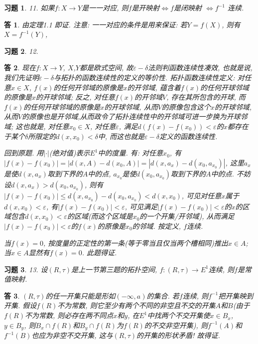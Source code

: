 \documentclass{ctexart}%
\newtheorem*{exercise}{习题}
\newtheorem*{solution}{答}
\theoremstyle{definition}
\theoremstyle{remark}
\begin{document}
\begin{exercise}11. 如果$f: X\rightarrow Y$是一一对应, 则$f$是开映射$\Longleftrightarrow f$是闭映射
$\Longleftrightarrow f^{-1}$ 连续.
\end{exercise}
\begin{solution}由定理1.1 即证. 注意: 一一对应的条件是用来保证: 若$Y=f(X)$, 则有$X=f^{-1}(Y)$, 
\end{solution}

\begin{exercise}12. 
\end{exercise}
\begin{solution}现在$f:X\rightarrow Y$, $X$,$Y$都是欧式空间, 故$\varepsilon-\delta$法则判函数连续性凑效, 也就是说, 我们先证明$\varepsilon-\delta$与拓扑的函数连续性的定义的等价性. 拓扑函数连续性定义: 对任意$x\in X$, $f(x)$的任何开邻域的原像是$x$的开邻域, 蕴含着$f(x)$的任何开球邻域的原像是$x$的开球邻域; 反之, 对任意$f(x)$的开邻域$V$, 存在其所包含的开球, 而$f(x)$的任何开球邻域的原像是$x$的开球邻域, 从而$V$的原像包含这个$x$的开球邻域, 从而$V$的原像也是开邻域,从而政令了拓扑连续性中的开邻域可进一步换为开球邻域; 这也就是, 对任意$x_0\in X$, 对任意$\varepsilon$, 满足$d(f(x)-f(x_0))<\varepsilon$的$x$都存在于某个$\delta$所限定的$d(x,x_0)<\delta$中, 而这也就是$\varepsilon-\delta$定义的函数连续性. 

回到原题. 用$|\cdot|$(绝对值)表示$E^1$中的度量. 有: 对任意$x_0$, 有$|f(x)-f(x_0)|
=|d(x,A)-d(x_0,A)|=|d(x,a_x)-d(x_0,a_{x_0})|$, 这里$a_x$是使$d(x,a_x)$取到下界的$A$中的点, $a_{x_0}$是使$d(x_0,a_{x_0})$取到下界的$A$中的点. 不妨设$d(x,a_x)>d(x_0,a_{x_0})$, 则有
$|f(x)-f(x_0)| \leq d(x,a_{x_0})-d(x_0,a_{x_0}) <d(x,x_0)$, 可见对任意$x$属于$d(x,x_0)<\varepsilon$, 有$|f(x)-f(x_0)|<\varepsilon$, 可见满足$|f(x)-f(x_0)|<\varepsilon$的$x$的区域包含$d(x,x_0)<\varepsilon$的区域(而这个区域是$x_0$的一个开集/开邻域), 从而满足$|f(x)-f(x_0)|<\varepsilon$的$f(x)$的原像是$x_0$的邻域. 按定义, $f$连续. 

当$f(x)=0$, 按度量的正定性的第一条(等于零当且仅当两个槽相同)推出$x\in A$; 当$x\in A$显然有$f(x)=0$. 此题得证.
\end{solution}

\begin{exercise}13. 设$(R,\tau)$是上一节第三题的拓扑空间, $f:(R,\tau)\rightarrow E^1$连续, 则$f$是常值映射. 
\end{exercise}
\begin{solution}$(R,\tau)$的任一开集只能是形如$(-\infty, a)$的集合. 若$f$连续, 则$f^{-1}$把开集映到开集. 假设$f(R)$不为常数, 则它至少有两个不同的非空且不交的开集$A$和$B$(由于$f(R)$不为常数, 则必存在两不同点$x$和$y$, 在$E^1$中找两个不交开集使$x\in B_x$, $y\in B_y$, 则$B_x \cap f(R)$和$B_y\cap f(R)$为$f(R)$的不交非空开集), 则$f^{-1}(A)$和$f^{-1}(B)$也应为非空不交开集, 这与$(R,\tau)$的开集的形状矛盾! 故得证.
\end{solution}
\end{document}
